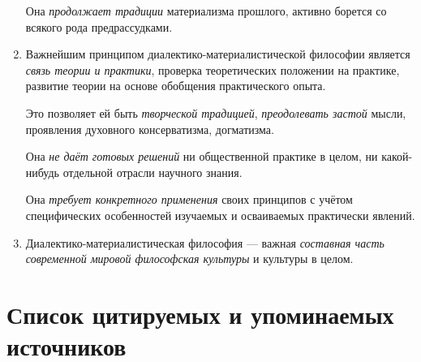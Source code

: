 \documentclass[a4paper,14pt,russian]{extreport}
\begin{document}
\begin{enumerate}
Она \emph{продолжает традиции} материализма прошлого, активно борется со всякого рода предрассудками.

\item   Важнейшим принципом диалектико-материалистической философии является   \emph{связь теории и практики}, проверка теоретических   положении на практике, развитие теории на основе обобщения   практического опыта.

Это позволяет ей быть \emph{творческой традицией}, \emph{преодолевать застой} мысли, проявления духовного консерватизма, догматизма.

Она \emph{не даёт готовых решений} ни общественной практике в целом, ни какой-нибудь отдельной отрасли научного знания.

Она \emph{требует конкретного применения} своих принципов с учётом специфических особенностей изучаемых и осваиваемых практически явлений.

\item Диалектико-материалистическая философия --- важная \emph{составная часть современной мировой философская культуры} и культуры в целом.
\end{enumerate}

\chapter{Список цитируемых и упоминаемых источников}
\end{document}
